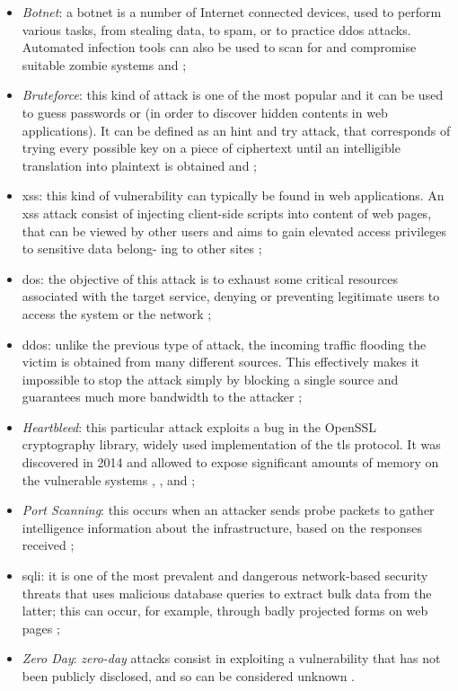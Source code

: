 \begin{itemize}
    \item[\faCaretRight] \textit{Botnet}: a botnet is a number of Internet connected devices, used to perform various tasks, from stealing data, to spam, or to practice \gls{ddos} attacks. Automated infection tools can also be used to scan for and compromise suitable zombie systems \cite{icissp18} and \cite[p.~250]{Sharafaldin2019};
    \item[\faCaretRight] \textit{Bruteforce}: this kind of attack is one of the most popular and it can be used to guess passwords or  (in order to discover hidden contents in web applications). It can be defined as an hint and try attack, that corresponds of trying every possible key on a piece of ciphertext until an intelligible translation into plaintext is obtained \cite{icissp18} and \cite[p.~43]{Sharafaldin2019};
    \item[\faCaretRight] \gls{xss}: this kind of vulnerability can typically be found in web applications. An \gls{xss} attack consist of injecting client-side scripts into  content of web pages, that can be viewed by other users and aims to gain elevated access privileges to sensitive data belong- ing to other sites \cite[p.~387]{Sharafaldin2019};
    \item[\faCaretRight] \gls{dos}: the objective of this attack is to exhaust some critical resources associated with the target service, denying or preventing legitimate users to access the system or the network \cite[p.~241]{Sharafaldin2019};
    \item[\faCaretRight] \gls{ddos}: unlike the previous type of attack, the incoming traffic flooding the victim is obtained from many different sources. This effectively makes it impossible to stop the attack simply by blocking a single source and guarantees much more bandwidth to the attacker \cite[p.~241]{Sharafaldin2019};
    \item[\faCaretRight] \textit{Heartbleed}: this particular attack exploits a bug in the OpenSSL cryptography library, widely used implementation of the \gls{tls} protocol. It was discovered in 2014 and allowed to expose significant amounts of memory on the vulnerable systems \cite{Carvalho2014}, \cite[p.~706]{Sharafaldin2019}, \cite{icissp18} and \cite{Stallings2014};
    \item[\faCaretRight] \textit{Port Scanning}: this occurs when an attacker sends probe packets to gather intelligence information about the infrastructure, based on the responses received \cite{icissp18};
    \item[\faCaretRight] \gls{sqli}: it is one of the most prevalent and dangerous network-based security threats that uses malicious database queries to extract bulk data from the latter; this can occur, for example, through badly projected forms on web pages \cite[p.~163]{Sharafaldin2019};
    \item[\faCaretRight] \textit{Zero Day}: \textit{zero-day} attacks consist in exploiting a vulnerability that has not been publicly disclosed, and so can be considered unknown \cite{Bilge2012}.
\end{itemize}
